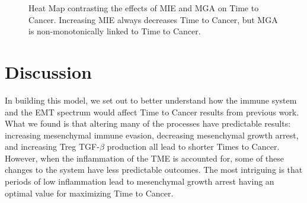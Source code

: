 \documentclass{article}
\begin{document}
\begin{figure}[H]
\center
{}
\caption{Heat Map contrasting the effects of MIE and MGA on Time to Cancer. Increasing MIE always decreases Time to Cancer, but MGA is non-monotonically linked to Time to Cancer.}
\label{fig:MIEvsMGA}
\end{figure}


\section{Discussion}\label{Discussion}
In building this model, we set out to better understand how the immune system and the EMT spectrum would affect Time to Cancer results from previous work.
What we found is that altering many of the processes have predictable results: increasing mesenchymal immune evasion, decreasing mesenchymal growth arrest, and increasing Treg TGF-$\beta$ production all lead to shorter Times to Cancer.
However, when the inflammation of the TME is accounted for, some of these changes to the system have less predictable outcomes.
The most intriguing is that periods of low inflammation lead to mesenchymal growth arrest having an optimal value for maximizing Time to Cancer.



\end{document}
